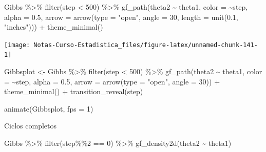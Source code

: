 \documentclass[
  12pt,
]{book}
\newenvironment{Shaded}{\begin{snugshade}}{\end{snugshade}}
\newcommand{\AttributeTok}[1]{\textcolor[rgb]{0.77,0.63,0.00}{#1}}
\newcommand{\DecValTok}[1]{\textcolor[rgb]{0.00,0.00,0.81}{#1}}
\newcommand{\FloatTok}[1]{\textcolor[rgb]{0.00,0.00,0.81}{#1}}
\newcommand{\FunctionTok}[1]{\textcolor[rgb]{0.00,0.00,0.00}{#1}}
\newcommand{\NormalTok}[1]{#1}
\newcommand{\OtherTok}[1]{\textcolor[rgb]{0.56,0.35,0.01}{#1}}
\newcommand{\SpecialCharTok}[1]{\textcolor[rgb]{0.00,0.00,0.00}{#1}}
\newcommand{\StringTok}[1]{\textcolor[rgb]{0.31,0.60,0.02}{#1}}
\theoremstyle{definition}
\theoremstyle{definition}
\theoremstyle{definition}
\theoremstyle{remark}
\begin{document}
\begin{Shaded}
\begin{Highlighting}[]
\NormalTok{Gibbs }\SpecialCharTok{\%\textgreater{}\%} \FunctionTok{filter}\NormalTok{(step }\SpecialCharTok{\textless{}} \DecValTok{500}\NormalTok{) }\SpecialCharTok{\%\textgreater{}\%} \FunctionTok{gf\_path}\NormalTok{(theta2 }\SpecialCharTok{\textasciitilde{}}\NormalTok{ theta1, }
    \AttributeTok{color =} \SpecialCharTok{\textasciitilde{}}\NormalTok{step, }\AttributeTok{alpha =} \FloatTok{0.5}\NormalTok{, }\AttributeTok{arrow =} \FunctionTok{arrow}\NormalTok{(}\AttributeTok{type =} \StringTok{"open"}\NormalTok{, }
        \AttributeTok{angle =} \DecValTok{30}\NormalTok{, }\AttributeTok{length =} \FunctionTok{unit}\NormalTok{(}\FloatTok{0.1}\NormalTok{, }\StringTok{"inches"}\NormalTok{))) }\SpecialCharTok{+} 
    \FunctionTok{theme\_minimal}\NormalTok{()}
\end{Highlighting}
\end{Shaded}

\begin{center}\texttt{[image: Notas-Curso-Estadistica\_files/figure-latex/unnamed-chunk-141-1]} \end{center}

\begin{Shaded}
\begin{Highlighting}[]
\NormalTok{Gibbsplot }\OtherTok{\textless{}{-}}\NormalTok{ Gibbs }\SpecialCharTok{\%\textgreater{}\%} \FunctionTok{filter}\NormalTok{(step }\SpecialCharTok{\textless{}} \DecValTok{500}\NormalTok{) }\SpecialCharTok{\%\textgreater{}\%} \FunctionTok{gf\_path}\NormalTok{(theta2 }\SpecialCharTok{\textasciitilde{}} 
\NormalTok{    theta1, }\AttributeTok{color =} \SpecialCharTok{\textasciitilde{}}\NormalTok{step, }\AttributeTok{alpha =} \FloatTok{0.5}\NormalTok{, }\AttributeTok{arrow =} \FunctionTok{arrow}\NormalTok{(}\AttributeTok{type =} \StringTok{"open"}\NormalTok{, }
    \AttributeTok{angle =} \DecValTok{30}\NormalTok{)) }\SpecialCharTok{+} \FunctionTok{theme\_minimal}\NormalTok{() }\SpecialCharTok{+} \FunctionTok{transition\_reveal}\NormalTok{(step)}

\FunctionTok{animate}\NormalTok{(Gibbsplot, }\AttributeTok{fps =} \DecValTok{1}\NormalTok{)}
\end{Highlighting}
\end{Shaded}

Ciclos completos

\begin{Shaded}
\begin{Highlighting}[]
\NormalTok{Gibbs }\SpecialCharTok{\%\textgreater{}\%} \FunctionTok{filter}\NormalTok{(step}\SpecialCharTok{\%\%}\DecValTok{2} \SpecialCharTok{==} \DecValTok{0}\NormalTok{) }\SpecialCharTok{\%\textgreater{}\%} \FunctionTok{gf\_density2d}\NormalTok{(theta2 }\SpecialCharTok{\textasciitilde{}} 
\NormalTok{    theta1)}
\end{Highlighting}
\end{Shaded}
\end{document}
